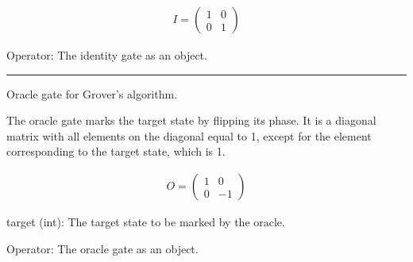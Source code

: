 \documentclass[letterpaper,10pt,english]{sphinxmanual}
\begin{document}
\begin{fulllineitems}
\begin{fulllineitems}
\sphinxAtStartPar
{}
\begin{equation*}
\begin{split}I = 
    \begin{pmatrix}
        1 & 0 \\
        0 & 1
    \end{pmatrix}\end{split}
\end{equation*}\begin{description}
\sphinxAtStartPar
Operator: The identity gate as an  object.

\end{description}

\end{fulllineitems}



\bigskip\hrule\bigskip


\begin{fulllineitems}
\label{\detokenize{index:gates.Gate.oracle}}
\pysigstartsignatures
{}
\pysigstopsignatures
\sphinxAtStartPar
Oracle gate for Grover’s algorithm.

\sphinxAtStartPar
The oracle gate marks the target state by flipping its phase. It is a
diagonal matrix with all elements on the diagonal equal to 1, except for
the element corresponding to the target state, which is \sphinxhyphen{}1.

\sphinxAtStartPar
{}
\begin{equation*}
\begin{split}O = 
    \begin{pmatrix}
        1 & 0 \\
        0 & -1
    \end{pmatrix}\end{split}
\end{equation*}\begin{description}
\sphinxAtStartPar
target (int): The target state to be marked by the oracle.

\sphinxAtStartPar
Operator: The oracle gate as an  object.


\end{description}
\end{fulllineitems}
\end{fulllineitems}
\end{document}
